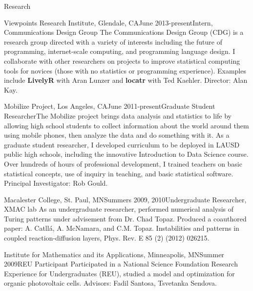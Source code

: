 \documentclass{resume} %
\begin{document}
\begin{rSection}{Research}

\begin{pSubsection}{Viewpoints Research Institute, }{Glendale, CA}{June 2013-present}{Intern, Communications Design Group}
{The Communications Design Group (CDG) is a research group directed with a variety of interests including the future of programming, internet-scale computing, and programming language design. I collaborate with other researchers on projects to improve statistical computing tools for novices (those with no statistics or programming experience). Examples include \textbf{LivelyR} with Aran Lunzer and \textbf{locatr} with Ted Kaehler. Director: Alan Kay.}
\end{pSubsection}


\begin{pSubsection}{Mobilize Project, }{Los Angeles, CA}{June 2011-present}{Graduate Student Researcher}{The Mobilize project brings data analysis and statistics to life by allowing high school students to collect information about the world around them using mobile phones, then analyze the data and do something with it. As a graduate student researcher, I developed curriculum to be deployed in LAUSD public high schools, including the innovative Introduction to Data Science course. Over hundreds of hours of professional development, I trained teachers on basic statistical concepts, use of inquiry in teaching, and basic statistical software. Principal Investigator: Rob Gould.}
\end{pSubsection}


\begin{pSubsection}{Macalester College, }{St. Paul, MN}{Summers 2009, 2010}{Undergraduate Researcher, XMAC lab}
{As an undergraduate researcher, performed numerical analysis of Turing patterns under advisement from Dr. Chad Topaz. Produced a coauthored paper: A. Catll{\'a}, A. McNamara, and C.M. Topaz. Instabilities and patterns in coupled reaction-diffusion layers, Phys. Rev. E 85 (2) (2012) 026215.}
\end{pSubsection}


\begin{pSubsection}{Institute for Mathematics and its Applications, }{Minneapolis, MN}{Summer 2009}{REU Participant}
{Participated in a National Science Foundation Research Experience for Undergraduates (REU), studied a model and optimization for organic photovoltaic cells. Advisors: Fadil Santosa, Tsvetanka Sendova.}
\end{pSubsection}
\end{rSection}
\end{document}
